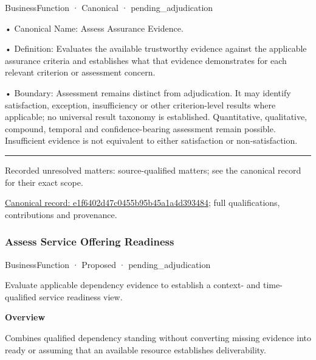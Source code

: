 \label{element:e1f6402d47c0455b95b45a1a4d393484}
{\small BusinessFunction · Canonical · pending\_adjudication}\par

•
Canonical Name: Assess Assurance Evidence.



•
Definition: Evaluates the available trustworthy evidence against the applicable assurance criteria and establishes what that evidence demonstrates for each relevant criterion or assessment concern.



•
Boundary: Assessment remains distinct from adjudication. It may identify satisfaction, exception, insufficiency or other criterion-level results where applicable; no universal result taxonomy is established. Quantitative, qualitative, compound, temporal and confidence-bearing assessment remain possible. Insufficient evidence is not equivalent to either satisfaction or non-satisfaction.



\medskip\hrule\medskip

{\small Recorded unresolved matters: source-qualified matters; see the canonical record for their exact scope.}\par
{\footnotesize \href{../../../../continuum/business/business-function/e1f6402d47c0455b95b45a1a4d393484.md}{Canonical record: e1f6402d47c0455b95b45a1a4d393484}; full qualifications, contributions and provenance.}\par
\subsubsection{Assess Service Offering Readiness}

\label{element:a7eb76c1ff5b450b9835ac19662c8148}
{\small BusinessFunction · Proposed · pending\_adjudication}\par

Evaluate applicable dependency evidence to establish a context- and time-qualified service readiness view.



\textbf{Overview}



Combines qualified dependency standing without converting missing evidence into ready or assuming that an available resource establishes deliverability.



